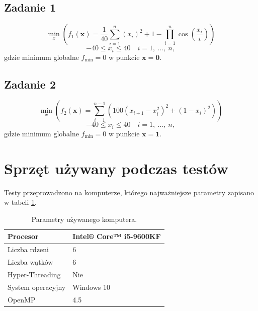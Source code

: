 \documentclass[11pt, a4paper, oneside]{article}
\newcommand{\vect}[1]{\bm{\mathbf{#1}}}
\begin{document}
\subsection{Zadanie 1}
\begin{equation}
\min_{x} \left(f_{1}\left(\vect{x}\right) = \frac{1}{40} \sum_{i=1}^{n}\left(x_{i}\right)^{2} + 1 - \prod_{i =1}^{n} \cos\left(\frac{x_{i}}{i}\right)\right)
\end{equation}
\begin{equation}
-40 \leq x_{i} \leq 40 \quad i = 1, \ ..., \ n,
\end{equation}
gdzie minimum globalne $f_{\mathrm{min}} = 0$ w punkcie $\vect{x} = \vect{0}$.

\subsection{Zadanie 2}
\begin{equation}
\min_{x} \left(f_{2}\left(\vect{x}\right) = \sum_{i=1}^{n-1}\left(100\left(x_{i+1}-x_{i}^{2}\right)^{2} + \left(1-x_{i}\right)^{2} \right) \right)
\end{equation}
\begin{equation}
-40 \leq x_{i} \leq 40 \quad i = 1, \ ..., \ n,
\end{equation}
gdzie minimum globalne $f_{\mathrm{min}} = 0$ w punkcie $\vect{x} = \vect{1}$.

\section{Sprzęt używany podczas testów} 

Testy przeprowadzono na komputerze, którego najważniejsze parametry zapisano w tabeli \ref{tab:parametry}.

\begin{table}[h]
\centering
\begin{tabular}{|l|l|}
\hline
Procesor          & Intel® Core™ i5-9600KF \\ \hline
Liczba rdzeni     & 6                              \\ \hline
Liczba wątków     & 6                              \\ \hline
Hyper-Threading   & Nie                                 \\ \hline
System operacyjny & Windows 10       \\ \hline
OpenMP			  & 4.5							        \\ \hline
\end{tabular}
\caption{Parametry używanego komputera.}
\label{tab:parametry}
\end{table}
\end{document}
